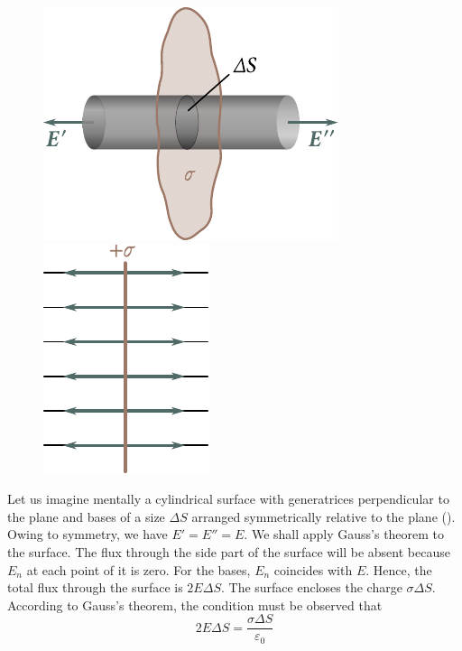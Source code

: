 \begin{figure}[t]
	\begin{minipage}[t]{0.5\linewidth}
		\begin{center}
			\includegraphics[scale=1]{figures/ch_01/fig_1_37.pdf}
			\caption[]{}
			\label{fig:1_37}
		\end{center}
	\end{minipage}
	\hspace{-0.05cm}
	\begin{minipage}[t]{0.5\linewidth}
		\begin{center}
			\includegraphics[scale=1]{figures/ch_01/fig_1_38.pdf}
			\caption[]{}
			\label{fig:1_38}
		\end{center}
	\end{minipage}
\vspace{-0.4cm}
\end{figure}

Let us imagine mentally a cylindrical surface with generatrices perpendicular to the plane and bases of a size $\Delta{S}$ arranged symmetrically relative to the plane (). Owing to symmetry, we have $E'=E''=E$. We shall apply Gauss's theorem to the surface. The flux through the side part of the surface will be absent because $E_n$ at each point of it is zero. For the bases, $E_n$ coincides with $E$. Hence, the total flux through the surface is $2E\Delta{S}$. The surface encloses the charge $\sigma\Delta{S}$. According to Gauss's theorem, the condition must be observed that
\begin{equation*}
	2E\Delta{S} = \frac{\sigma\Delta{S}}{\varepsilon_0}
\end{equation*}


